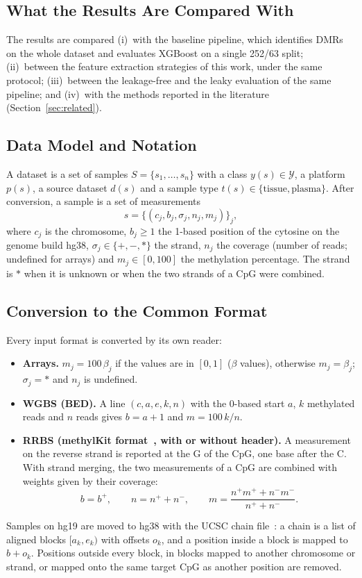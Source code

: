 \documentclass[runningheads]{llncs}
\begin{document}
\subsection{What the Results Are Compared With}
The results are compared (i)~with the baseline pipeline, which identifies DMRs on the whole dataset and evaluates XGBoost on a single 252/63 split; (ii)~between the feature extraction strategies of this work, under the same protocol; (iii)~between the leakage-free and the leaky evaluation of the same pipeline; and (iv)~with the methods reported in the literature (Section~\ref{sec:related}).

\subsection{Data Model and Notation}
A dataset is a set of samples $S=\{s_1,\dots,s_n\}$ with a class $y(s)\in\mathcal{Y}$, a platform $p(s)$, a source dataset $d(s)$ and a sample type $t(s)\in\{\text{tissue},\text{plasma}\}$. After conversion, a sample is a set of measurements
\[
s=\{(c_j, b_j, \sigma_j, n_j, m_j)\}_{j},
\]
where $c_j$ is the chromosome, $b_j\geq 1$ the 1-based position of the cytosine on the genome build hg38, $\sigma_j\in\{+,-,*\}$ the strand, $n_j$ the coverage (number of reads; undefined for arrays) and $m_j\in[0,100]$ the methylation percentage. The strand is $*$ when it is unknown or when the two strands of a CpG were combined.

\subsection{Conversion to the Common Format}
Every input format is converted by its own reader:
\begin{itemize}
\item \textbf{Arrays.} $m_j=100\,\beta_j$ if the values are in $[0,1]$ ($\beta$ values), otherwise $m_j=\beta_j$; $\sigma_j=*$ and $n_j$ is undefined.
\item \textbf{WGBS (BED).} A line $(c,a,e,k,n)$ with the 0-based start $a$, $k$ methylated reads and $n$ reads gives $b=a+1$ and $m=100\,k/n$.
\item \textbf{RRBS (methylKit format~\cite{akalin2012}, with or without header).} A measurement on the reverse strand is reported at the G of the CpG, one base after the C. With strand merging, the two measurements of a CpG are combined with weights given by their coverage:
\[
b = b^{+},\qquad n = n^{+}+n^{-},\qquad m = \frac{n^{+}m^{+}+n^{-}m^{-}}{n^{+}+n^{-}}.
\]
\end{itemize}
Samples on hg19 are moved to hg38 with the UCSC chain file~\cite{kent2002}: a chain is a list of aligned blocks $[a_k,e_k)$ with offsets $o_k$, and a position inside a block is mapped to $b+o_k$. Positions outside every block, in blocks mapped to another chromosome or strand, or mapped onto the same target CpG as another position are removed.
\end{document}
